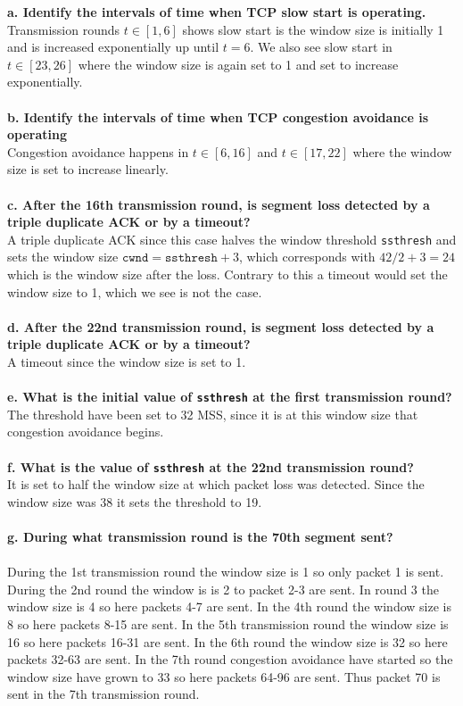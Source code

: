 \textbf{a. Identify the intervals of time when TCP slow start is operating.} \\
Transmission rounds $t \in [1,6]$ shows slow start is the window size is initially 1 and is increased exponentially up until $t=6$. We also see slow start in $t \in [23, 26]$ where the window size is again set to 1 and set to increase exponentially. \\
\\
\textbf{b. Identify the intervals of time when TCP congestion avoidance is operating} \\
Congestion avoidance happens in $t \in [6, 16]$ and $t \in [17, 22]$ where the window size is set to increase linearly. \\
\\
\textbf{c. After the 16th transmission round, is segment loss detected by a triple duplicate ACK or by a timeout?} \\
A triple duplicate ACK since this case halves the window threshold \texttt{ssthresh} and sets the window size $\texttt{cwnd} = \texttt{ssthresh} + 3$, which corresponds with $42/2 + 3 = 24$ which is the window size after the loss. Contrary to this a timeout would set the window size to 1, which we see is not the case. \\
\\
\textbf{d. After the 22nd transmission round, is segment loss detected by a triple duplicate ACK or by a timeout?} \\
A timeout since the window size is set to 1.\\
\\
\textbf{e. What is the initial value of \texttt{ssthresh} at the first transmission round?} \\
The threshold have been set to 32 MSS, since it is at this window size that congestion avoidance begins.\\
\\
\textbf{f. What is the value of \texttt{ssthresh} at the 22nd transmission round?} \\
It is set to half the window size at which packet loss was detected. Since the window size was 38 it sets the threshold to 19.\\
\\
\textbf{g. During what transmission round is the 70th segment sent?} \\
\\
During the 1st transmission round the window size is 1 so only packet 1 is sent. During the 2nd round the window is is 2 to packet 2-3 are sent. In round 3 the window size is 4 so here packets 4-7  are sent. In the 4th round the window size is 8 so here packets  8-15 are sent. In the 5th transmission round the window size is 16 so here packets 16-31 are sent. In the 6th round the window size is 32 so here packets 32-63 are sent. In the 7th round congestion avoidance have started so the window size have grown to 33 so here  packets 64-96 are sent. Thus packet 70 is sent in the 7th transmission round. \\

